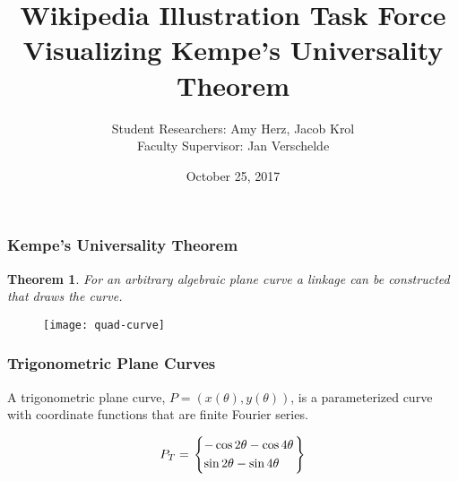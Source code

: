 \documentclass{beamer}
\title{
	Wikipedia Illustration Task Force \\
	\large Visualizing Kempe's Universality Theorem}
\author{Student Researchers: Amy Herz, Jacob Krol \\
	Faculty Supervisor: Jan Verschelde}
\institute{}
\date{October 25, 2017}
\theoremstyle{theorem}
\newtheorem{thm}{Theorem}
\theoremstyle{definition}
\begin{document}
\frame{\titlepage}



\begin{frame} %
\frametitle{Kempe's Universality Theorem}
\begin{thm}
For an arbitrary algebraic plane curve a linkage can be constructed that draws the curve.
\end{thm}

\begin{center}
\begin{figure}
\texttt{[image: quad-curve]}
\end{figure}
\end{center}

\end{frame}


\begin{frame}
\frametitle{Trigonometric Plane Curves}

\begin{definition}
A trigonometric plane curve, $P=(x(\theta),y(\theta))$, is a parameterized curve with coordinate functions that are finite Fourier series. 
\end{definition}

\begin{example}
\[
P_{T}=\begin{rcases}
	\begin{dcases} 
	-\cos{2\theta} - \cos{4\theta}\\
	\sin{2\theta} - \sin{4\theta}
	\end{dcases}
	\end{rcases}
\]
\end{example}

\end{frame}

\end{document}
